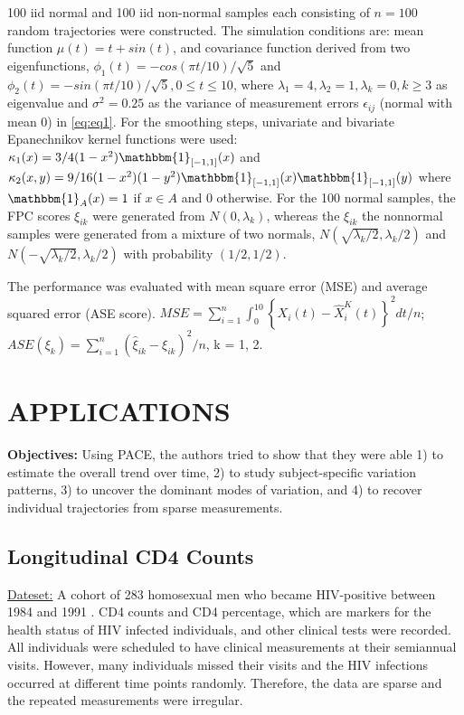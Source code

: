 \documentclass[11pt]{report}
\begin{document}
100 iid normal and 100 iid non-normal samples each consisting of $n = 100$ random trajectories were constructed. 
The simulation conditions are: mean function $\mu(t) = t + sin(t)$, and covariance function derived from two eigenfunctions, $\phi_1(t) = -cos(\pi t/10)/\sqrt{5}$ and $\phi_2(t) = -sin(\pi t/10)/\sqrt{5}, 0 \leq t \leq 10$, where $\lambda_1 = 4, \lambda_2 = 1, \lambda_k = 0, k \geq 3$ as eigenvalue and $\sigma^2 = 0.25$ as the variance of measurement errors $\epsilon_{ij}$ (normal with mean 0) in \eqref{eq:eq1}. 
For the smoothing steps, univariate and bivariate Epanechnikov kernel functions were used: $\kappa_1 (x) = 3/4 (1 - x^2) \mathbbm{1}_{[-1, 1]} (x) $ and $\kappa_2 (x, y) = 9/16 (1 - x^2)(1 - y^2) \mathbbm{1}_{[-1, 1]} (x) \mathbbm{1}_{[-1, 1]} (y)$ where $\mathbbm{1}_A (x) = 1$ if $x \in A$ and 0 otherwise.  
For the 100 normal samples, the FPC scores $\xi_{ik}$ were generated from $N(0,\lambda_k)$, whereas the $\xi_{ik}$ the nonnormal samples were generated from a mixture of two normals, $N(\sqrt{\lambda_k/2}, \lambda_k/2) $ and $ N(-\sqrt{\lambda_k/2}, \lambda_k/2)$ with probability $(1/2, 1/2)$.

The performance was evaluated with mean square error (MSE) and average squared error (ASE score). 
$MSE = \sum_{i = 1}^{n} \int_{0}^{10} \left\{X_i(t) - \widehat{X}_i^K(t) \right\}^2 dt/n $; 
$ASE(\xi_k) = \sum_{i = 1}^n (\hat{\xi}_{ik} - \xi_{ik})^2/n$, k = 1, 2. 

\section{APPLICATIONS}

\noindent \textbf{Objectives:} Using PACE, the authors tried to show that they were able 1) to estimate the overall trend over time, 2) to study subject-specific variation patterns, 3) to uncover the dominant modes of variation, and 4) to recover individual trajectories from sparse measurements.

\subsection*{Longitudinal CD4 Counts}
\noindent \underline{Dateset:} A cohort of 283 homosexual men who became HIV-positive between 1984 and 1991 \cite{Kaslow1987}. 
CD4 counts and CD4 percentage, which are markers for the health status of HIV infected individuals, and other clinical tests were recorded.
All individuals were scheduled to have clinical measurements at their semiannual visits. 
However, many individuals missed their visits and the HIV infections occurred at different time points randomly. 
Therefore, the data are sparse and the repeated measurements were irregular. 
\end{document}
